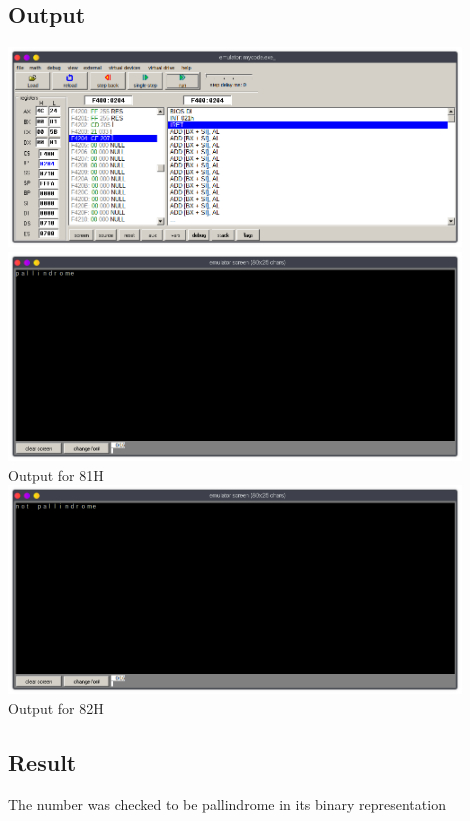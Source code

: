 \subsection{Output}
\begin{center}
	\includegraphics[width=0.90\textwidth]{img/p16/ss1.png}
	\includegraphics[width=0.90\textwidth]{img/p16/ss2.png}\\
    Output for 81H\\

    \includegraphics[width=0.90\textwidth]{img/p16/ss3.png}\\
    Output for 82H\\
\end{center}

\subsection{Result}
The number was checked to be pallindrome in its binary representation

